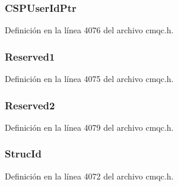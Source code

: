 \subsubsection[{C\+S\+P\+User\+Id\+Ptr}]{ C\+S\+P\+User\+Id\+Ptr}\label{structtag_m_q_c_s_p_aea9286fc5888c80fc6f7ee4788ac80bd}


Definición en la línea 4076 del archivo cmqc.\+h.

\hypertarget{structtag_m_q_c_s_p_a740233cdc4196cbb81a6891c320232cf}{}
\subsubsection[{Reserved1}]{ Reserved1}\label{structtag_m_q_c_s_p_a740233cdc4196cbb81a6891c320232cf}


Definición en la línea 4075 del archivo cmqc.\+h.

\hypertarget{structtag_m_q_c_s_p_a7aaec4816b30006552c1ee477716f64d}{}
\subsubsection[{Reserved2}]{ Reserved2}\label{structtag_m_q_c_s_p_a7aaec4816b30006552c1ee477716f64d}


Definición en la línea 4079 del archivo cmqc.\+h.

\hypertarget{structtag_m_q_c_s_p_a0530922ca944569b52601d74941f96e4}{}
\subsubsection[{Struc\+Id}]{ Struc\+Id}\label{structtag_m_q_c_s_p_a0530922ca944569b52601d74941f96e4}


Definición en la línea 4072 del archivo cmqc.\+h.

\hypertarget{structtag_m_q_c_s_p_a0656ef8f766b3907d394d88a35d7b7e9}{}
